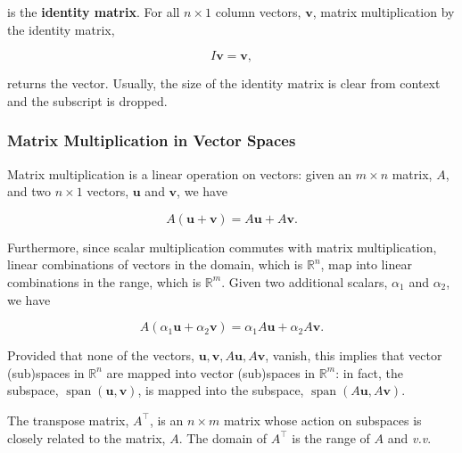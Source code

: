 \documentclass[12pt, twoside, draft]{article}
\begin{document}
is the \textbf{identity matrix}.  For all $n \times 1$ column vectors, $\mathbf{v}$, matrix multiplication by the identity matrix,

\begin{equation}\label{eq:identity_matrix_multiplication}
I \mathbf{v} = \mathbf{v},
\end{equation}

returns the vector.  Usually, the size of the identity matrix is clear from context and the subscript is dropped.

\subsubsection{Matrix Multiplication in Vector Spaces}\label{sec:matrix-multiplication-vector-spaces}
Matrix multiplication is a linear operation on vectors: given an $m \times n$ matrix, $A$, and two $n \times 1$ vectors, $\mathbf{u}$ and $\mathbf{v}$, we have

\begin{equation}\label{eq:matrix_multiplication_linearity}
A \left( \mathbf{u} + \mathbf{v} \right) = A\mathbf{u} + A\mathbf{v} .
\end{equation}

Furthermore, since scalar multiplication commutes with matrix multiplication, linear combinations of vectors in the domain, which is $\mathbb{R}^n$, map into linear combinations in the range, which is $\mathbb{R}^m$.  Given two additional scalars, $\alpha_1$ and $\alpha_2$, we have

\begin{equation}\label{eq:matrix_multiplication_linear_combination}
A \left( \alpha_1 \mathbf{u} + \alpha_2 \mathbf{v} \right) = \alpha_1 A\mathbf{u} + \alpha_2 A\mathbf{v} .
\end{equation}

Provided that none of the vectors, $\mathbf{u}, \mathbf{v}, A\mathbf{u}, A\mathbf{v}$, vanish, this implies that vector (sub)spaces in $\mathbb{R}^n$ are mapped into vector (sub)spaces in $\mathbb{R}^m$: in fact, the subspace, $\operatorname{span}(\mathbf{u}, \mathbf{v})$, is mapped into the subspace, $\operatorname{span}(A\mathbf{u}, A\mathbf{v})$.

The transpose matrix, $A^\top$, is an $n \times m$ matrix whose action on subspaces is closely related to the matrix, $A$.  The domain of $A^\top$ is the range of $A$ and \textit{v.v}.
\end{document}
